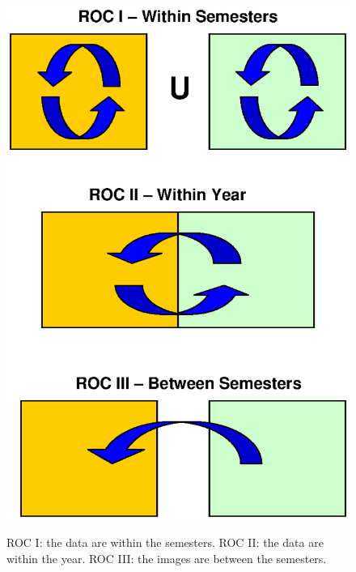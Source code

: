 \begin{figure}[tbp]
\begin{center}
  \includegraphics[scale = 0.5]{./chapters/Figures/ROC_details_III.eps}\\
  \caption{ROC I: the data are within the semesters. ROC II: the data are within
the year. ROC III: the images are between the
semesters.}\label{fig_ROC_detail}
\end{center}
\end{figure}

